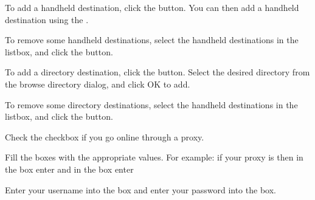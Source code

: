To add a handheld destination, click the  
button. You can then add a handheld destination using the
\helpignore{\ref{sec:pd-handheld-dest-dialog}}
.

To remove some handheld destinations, select the handheld destinations in 
the listbox, and click the  button.

To add a directory destination, click the 
 button. Select the desired directory 
from the browse directory dialog, and click OK to add. 

To remove some directory destinations, select the handheld destinations in 
the listbox, and click the  button.


Check the  checkbox if you
go online through a proxy. 

Fill the boxes with the appropriate values. For example: if your proxy is
 then in the 
box enter  and in the  box 
enter 


Enter your username into the  box and enter 
your password into the  box.



